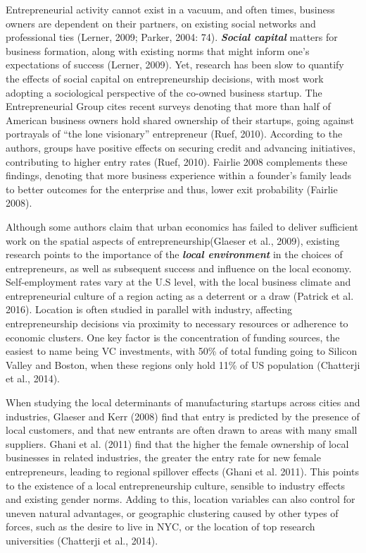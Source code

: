 Entrepreneurial activity cannot exist in a vacuum, and often times, business owners are dependent on their partners, on existing social networks and professional ties (Lerner, 2009; Parker, 2004: 74). \textbf{\textit{Social capital}} matters for business formation, along with existing norms that might inform one's expectations of success (Lerner, 2009). Yet, research has been slow to quantify the effects of social capital on entrepreneurship decisions, with most work adopting a sociological perspective of the co-owned business startup. The Entrepreneurial Group cites recent surveys denoting that more than half of American business owners hold shared ownership of their startups, going against portrayals of “the lone visionary” entrepreneur (Ruef, 2010). According to the authors, groups have positive effects on securing credit and advancing initiatives, contributing to higher entry rates (Ruef, 2010). Fairlie 2008 complements these findings, denoting that more business experience within a founder’s family leads to better outcomes for the enterprise and thus, lower exit probability (Fairlie 2008). 


Although some authors claim that urban economics has failed to deliver sufficient work on the spatial aspects of entrepreneurship(Glaeser et al., 2009), existing research points to the importance of the \textbf{\textit{local environment}} in the choices of entrepreneurs, as well as subsequent success and influence on the local economy. Self-employment rates vary at the U.S level, with the local business climate and entrepreneurial culture of a region acting as a deterrent or a draw (Patrick et al. 2016). Location is often studied in parallel with industry, affecting entrepreneurship decisions via proximity to necessary resources or adherence to economic clusters. One key factor is the concentration of funding sources, the easiest to name being VC investments, with 50\% of total funding going to Silicon Valley and Boston, when these regions only hold 11\% of US population (Chatterji et al., 2014). 

When studying the local determinants of manufacturing startups across cities and industries, Glaeser and Kerr (2008) find that entry is predicted by the presence of local customers, and that new entrants are often drawn to areas with many small suppliers. Ghani et al. (2011) find that the higher the female ownership of local businesses in related industries, the greater the entry rate for new female entrepreneurs, leading to regional spillover effects (Ghani et al. 2011). This points to the existence of a local entrepreneurship culture, sensible to industry effects and existing gender norms. Adding to this, location variables can also control for uneven natural advantages, or geographic clustering caused by other types of forces, such as the desire to live in NYC, or the location of top research universities (Chatterji et al., 2014). 

